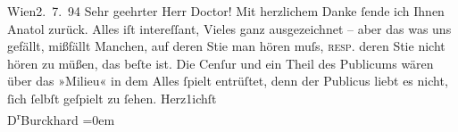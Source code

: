 \begin{ledgroupsized}[t]{13cm}
           \noindent{}{\pb}\textcolor{gray}{\textbf{\label{T_L00344-1v}\label{T_L00344-1h}}}\hfill Wien2. 7. 94\pend
           \pstart{}Sehr geehrter Herr Doctor!\pend\pstart
           Mit herzlichem Danke ſende ich Ihnen Anatol
                    zurück. Alles iſt intereſſant, Vieles ganz ausgezeichnet – aber das was uns
                    gefällt, mißfällt Manchen, auf deren Sti{\geminationm}e man
                    hören muſs, \textsc{resp.} deren Sti{\geminationm}e nicht hören zu müßen, das beſte ist. Die Cenſur
                    und ein Theil des Publicums wären über das »Milieu« in dem Alles ſpielt
                    entrüſtet, denn {\pb}der Publicus
                    liebt es nicht, ſich ſelbſt geſpielt zu ſehen.\pend
           \pstart
           Herz1ichſt{\\[\baselineskip]}\spacefill\mbox{D\textsuperscript{r}Burckhard}\pend
           \leftskip=0em{}
         
         \endnumbering{}\end{ledgroupsized}  \newcommand{\dateiname}{L00344}\newcommand{\titel}{Max Burckhard an Arthur Schnitzler, 2. 7. 1894}\newcommand{\editorInnen}{Martin Anton Müller und Gerd-Hermann Susen}
      